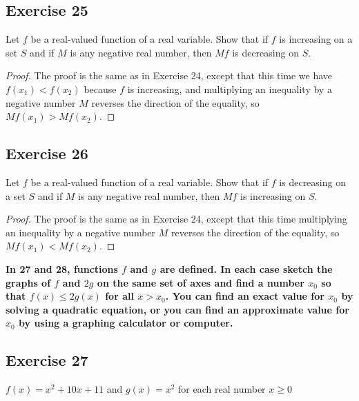 \documentclass[14pt]{extarticle}
\newcommand{\cy}{\color{cyan}}
\begin{document}
\subsection{Exercise 25}
Let \(f\) be a real-valued function of a real variable. Show that if \(f\) is increasing on a set \(S\) and if \(M\) is any 
negative real number, then \(Mf\) is decreasing on \(S\).

\begin{proof}
The proof is the same as in Exercise 24, except that this time we have \(f(x_1) < f(x_2)\) because \(f\) is increasing, and 
multiplying an inequality by a negative number \(M\) reverses
the direction of the equality, so \(Mf(x_1) > Mf(x_2)\).
\end{proof}

\subsection{Exercise 26}
Let \(f\) be a real-valued function of a real variable. Show that if \(f\) is decreasing on a set \(S\) and if \(M\) is any 
negative real number, then \(Mf\) is increasing on \(S\).

\begin{proof}
The proof is the same as in Exercise 24, except that this time 
multiplying an inequality by a negative number \(M\) reverses
the direction of the equality, so \(Mf(x_1) < Mf(x_2)\).
\end{proof}

{\bf \cy In 27 and 28, functions \(f\) and \(g\) are defined. In each case sketch the graphs of \(f\) and \(2g\) on the same 
set of axes and find a number \(x_0\) so that \(f(x) \leq 2g(x)\) for all \(x > x_0\). You can find an exact value for 
\(x_0\) by solving a quadratic equation, or you can find an approximate value for \(x_0\) by using a graphing calculator 
or computer.}

\subsection{Exercise 27}
\(f(x) = x^2 + 10x + 11\) and \(g(x) = x^2\) for each real number \(x \geq 0\)
\end{document}
